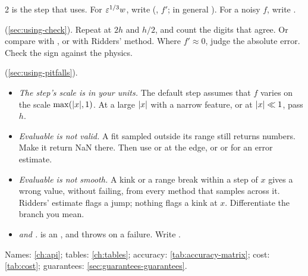 \begin{fullwidth}
\begin{multicols}{2}
  is the step that  uses. For
$\varepsilon^{1/3} w$, write  (, $f'$; in general
). For a noisy $f$, write
.

 (\cref{sec:using-check}). Repeat at $2h$ and $h/2$, and count the digits that
agree. Or compare with , or with Ridders' method. Where $f' \approx 0$, judge the absolute error.
Check the sign against the physics.

 (\cref{sec:using-pitfalls}).
\begin{itemize}\setlength{\itemsep}{1pt}\setlength{\parskip}{0pt}
  \item \emph{The step's scale is in your units.} The default step assumes that $f$ varies on the scale
    $\max(\lvert x \rvert, 1)$. At a large $\lvert x \rvert$ with a narrow feature, or at $\lvert x \rvert \ll 1$, pass $h$.
  \item \emph{Evaluable is not valid.} A fit sampled outside its range still returns numbers. Make it return NaN
    there. Then use  or  at the edge, or  or
     for an error estimate.
  \item \emph{Evaluable is not smooth.} A kink or a range break within a step of $x$ gives a wrong value, without
    failing, from every method that samples across it. Ridders' estimate flags a jump; nothing flags a kink at $x$.
    Differentiate the branch you mean.
  \item \emph{ and .}  is an , and
     throws on a failure. Write .

\end{itemize}

 Names: \cref{ch:api}; tables: \cref{ch:tables}; accuracy: \cref{tab:accuracy-matrix}; cost:
\cref{tab:cost}; guarantees: \cref{sec:guarantees-guarantees}.


\end{multicols}
\end{fullwidth}

